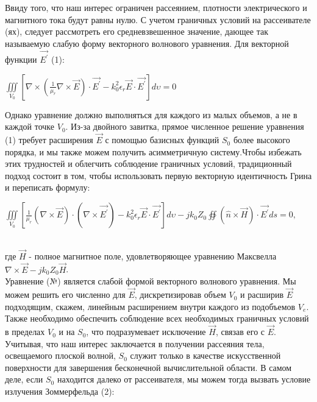 Ввиду того, что наш интерес ограничен рассеянием, плотности электрического и магнитного тока будут равны нулю.
С учетом граничных условий на рассеивателе (ях), следует рассмотреть его средневзвешенное значение, дающее так называемую слабую форму векторного волнового уравнения. Для векторной функции $ \vec{E^{'}} $ (1):\\
\begin{center}
	$ 	\iiint\limits_{V_{0}}^{} \left[ \nabla \times \left( \frac{1}{\mu_{r}}\nabla \times \vec{E}\right)\cdot \vec{E^{'}} - k_{0}^{2} \epsilon_{r}\vec{E} \cdot \vec{E^{'}} \right]d\upsilon = 0 $
\end{center}
Однако уравнение должно выполняться для каждого из малых объемов, а не в каждой точке $ V_{0} $. Из-за двойного завитка, прямое численное решение уравнения (1) требует расширения $ \vec{E} $ с помощью базисных функций $ S_{0} $ более высокого порядка, и мы также можем получить асимметричную систему.Чтобы избежать этих трудностей и облегчить соблюдение граничных условий, традиционный подход состоит в том, чтобы использовать первую векторную идентичность Грина и переписать формулу: \\
\begin{center}
	$ 	\iiint\limits_{V_{0}}^{} \left[ \frac{1}{\mu_{r}}(\nabla \times \vec{E}) \cdot (\nabla \times \vec{E^{'}}) - k_{0}^{2} \epsilon_{r}\vec{E} \cdot \vec{E^{'}} \right]d\upsilon - jk_{0}Z_{0} \oiint (\hat{n} \times \vec{H}) \cdot \vec{E^{'}}ds = 0,$
\end{center}\\
где $ \vec{H} $ - полное магнитное поле, удовлетворяющее уравнению Максвелла $ \nabla \times \vec{E} - jk_{0}Z_{0}\vec{H}  $.\\
Уравнение (№) является слабой формой векторного волнового уравнения. Мы можем решить его численно для $ \vec{E} $, дискретизировав объем $ V_{0} $ и расширив $ \vec{E} $ подходящим, скажем, линейным расширением внутри каждого из подобъемов $V_{e}$. \\
Также необходимо обеспечить соблюдение всех необходимых граничных условий в пределах $V_{0}$ и на $S_{0}$, что подразумевает исключение $\vec{H}$, связав его с $\vec{E}$. \\
Учитывая, что наш интерес заключается в получении рассеяния тела, освещаемого плоской волной, $S_{0}$ служит только в качестве искусственной поверхности для завершения бесконечной вычислительной области. В самом деле, если $S_{0}$ находится далеко от рассеивателя, мы можем тогда вызвать условие излучения Зоммерфельда (2): \\
